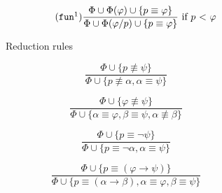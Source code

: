 \documentclass{article}
\theoremstyle{definition}
\newcommand*{\eq}{\equiv}
\newcommand*{\ra}{\rightarrow}
\begin{document}
\begin{figure}
\begin{subfigure}{\textwidth}
\begin{subfigure}{0.4\textwidth}
\begin{equation}
            \end{equation}
        \end{subfigure}
        \begin{subfigure}{0.5\textwidth}
            \begin{equation}
                \tag{$\texttt{fun}^1$}
                \frac{
                    \Phi \cup \Phi(\varphi) \cup \{ p \equiv \varphi \} }%
                { \Phi \cup \Phi(\varphi / p) \cup \{p \equiv \varphi\} }
                \text{ if $p$ < $\varphi$}
            \end{equation}
        \end{subfigure}
        \caption{Reduction rules}
    \end{subfigure}
    \begin{subfigure}{\textwidth}
        \centering
        \begin{subfigure}{0.4\textwidth}
            \begin{equation}
                \tag{$\not \equiv_1$}
                \frac{
                    \Phi \cup \{ p \not \equiv \psi \} }%
                { \Phi \cup \{ p \not \equiv \alpha, \alpha \equiv \psi \} }
            \end{equation}
        \end{subfigure}
        \begin{subfigure}{0.4\textwidth}
            \begin{equation}
                \tag{$\not \eq_2$}
                \frac{
                    \Phi \cup \{ \varphi \not \eq \psi \} }%
                { \Phi \cup \{ \alpha \eq \varphi, \beta \eq \psi, \alpha \not \eq \beta \} }
            \end{equation}
        \end{subfigure}
        \begin{subfigure}{0.4\textwidth}
            \begin{equation}
                \tag{$\eq_\lnot$}
                \frac{
                    \Phi \cup \{ p \eq \lnot \psi  \} }%
                { \Phi \cup \{ p \eq \lnot \alpha, \alpha \eq \psi \} }
            \end{equation}
        \end{subfigure}
        \begin{subfigure}{0.5\textwidth}
            \begin{equation}
                \tag{$ \eq_\ra $}
                \frac{
                    \Phi \cup \{ p \eq (\varphi \ra \psi) \} }%
                { \Phi \cup \{ p \eq (\alpha \ra \beta), \alpha \eq \varphi, \beta \eq \psi \} }

\end{equation}
\end{subfigure}
\end{subfigure}
\end{figure}
\end{document}
